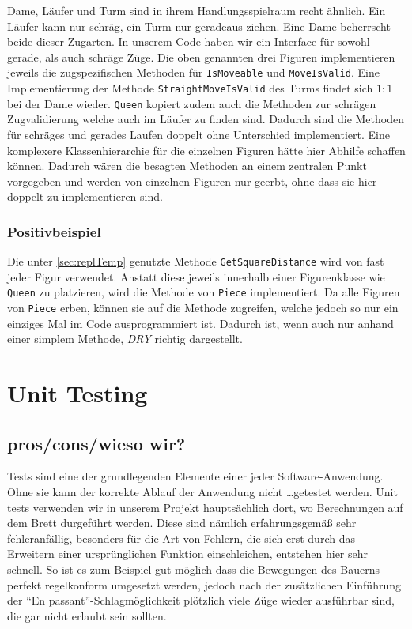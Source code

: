 \documentclass[
10pt, %
a4paper, %
oneside, %
headinclude,footinclude, %
BCOR5mm, %
]{scrartcl}
\begin{document}
\begin{onehalfspace}
Dame, Läufer und Turm sind in ihrem Handlungsspielraum recht ähnlich. Ein Läufer kann nur schräg, ein Turm nur geradeaus ziehen. Eine Dame beherrscht beide dieser Zugarten. In unserem Code haben wir ein Interface für sowohl gerade, als auch schräge Züge. Die oben genannten drei Figuren implementieren jeweils die zugspezifischen Methoden für \texttt{IsMoveable} und \texttt{MoveIsValid}. 
Eine Implementierung der Methode \texttt{StraightMoveIsValid} des Turms findet sich $1:1$ bei der Dame wieder. \texttt{Queen} kopiert zudem auch die Methoden zur schrägen Zugvalidierung welche auch im Läufer zu finden sind. Dadurch sind die Methoden für schräges und gerades Laufen doppelt ohne Unterschied implementiert. Eine komplexere Klassenhierarchie für die einzelnen Figuren hätte hier Abhilfe schaffen können. Dadurch wären die besagten Methoden an einem zentralen Punkt vorgegeben und werden von einzelnen Figuren nur geerbt, ohne dass sie hier doppelt zu implementieren sind.

\subsubsection{Positivbeispiel}
Die unter \autoref{sec:replTemp} genutzte Methode \texttt{GetSquareDistance} wird von fast jeder Figur verwendet. Anstatt diese jeweils innerhalb einer Figurenklasse wie \texttt{Queen} zu platzieren, wird die Methode von \texttt{Piece} implementiert. Da alle Figuren von \texttt{Piece} erben, können sie auf die Methode zugreifen, welche jedoch so nur ein einziges Mal im Code ausprogrammiert ist. Dadurch ist, wenn auch nur anhand einer simplem Methode, \textit{DRY} richtig dargestellt.
\newpage
\section{Unit Testing}
\subsection{pros/cons/wieso wir?}
Tests sind eine der grundlegenden Elemente einer jeder Software-Anwendung. Ohne sie kann der korrekte Ablauf der Anwendung nicht \dots getestet werden. Unit tests verwenden wir in unserem Projekt hauptsächlich dort, wo Berechnungen auf dem Brett durgeführt werden. Diese sind nämlich erfahrungsgemäß sehr fehleranfällig, besonders für die Art von Fehlern, die sich erst durch das Erweitern einer ursprünglichen Funktion einschleichen, entstehen hier sehr schnell. So ist es zum Beispiel gut möglich dass die Bewegungen des Bauerns perfekt regelkonform umgesetzt werden, jedoch nach der zusätzlichen Einführung der \enquote{En passant}-Schlagmöglichkeit plötzlich viele Züge wieder ausführbar sind, die gar nicht erlaubt sein sollten.


\end{onehalfspace}
\end{document}
